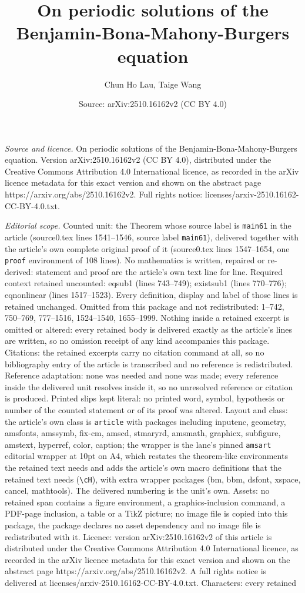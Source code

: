 \documentclass[10pt,a4paper]{amsart}
\title[On periodic solutions of the Benjamin-Bona-Mahony-Burgers eq]{On periodic solutions of the Benjamin-Bona-Mahony-Burgers equation}
\author{Chun Ho Lau, Taige Wang}
\date{Source: arXiv:2510.16162v2 (CC BY 4.0)}
\begin{document}
\maketitle

\noindent\emph{Source and licence.} On periodic solutions of the Benjamin-Bona-Mahony-Burgers equation. Version arXiv:2510.16162v2 (CC BY 4.0), distributed under the Creative Commons Attribution 4.0 International licence, as recorded in the arXiv licence metadata for this exact version and shown on the abstract page https://arxiv.org/abs/2510.16162v2. Full rights notice: licenses/arxiv-2510.16162-CC-BY-4.0.txt.\par\smallskip

\noindent\textit{Editorial scope.} Counted unit: the Theorem whose source label is \texttt{main61} in the article (source0.tex lines 1541--1546, source label \texttt{main61}), delivered together with the article's own complete original proof of it (source0.tex lines 1547--1654, one \texttt{proof} environment of 108 lines). No mathematics is written, repaired or re-derived: statement and proof are the article's own text line for line. Required context retained uncounted: eqsub1 (lines 743--749); existsub1 (lines 770--776); eqnonlinear (lines 1517--1523). Every definition, display and label of those lines is retained unchanged. Omitted from this package and not redistributed: 1--742, 750--769, 777--1516, 1524--1540, 1655--1999. Nothing inside a retained excerpt is omitted or altered: every retained body is delivered exactly as the article's lines are written, so no omission receipt of any kind accompanies this package. Citations: the retained excerpts carry no citation command at all, so no bibliography entry of the article is transcribed and no reference is redistributed. Reference adaptation: none was needed and none was made; every reference inside the delivered unit resolves inside it, so no unresolved reference or citation is produced. Printed slips kept literal: no printed word, symbol, hypothesis or number of the counted statement or of its proof was altered. Layout and class: the article's own class is \texttt{article} with packages including inputenc, geometry, amsfonts, amssymb, fix-cm, amscd, stmaryrd, amsmath, graphicx, subfigure, amstext, hyperref, color, caption; the wrapper is the lane's pinned \texttt{amsart} editorial wrapper at 10pt on A4, which restates the theorem-like environments the retained text needs and adds the article's own macro definitions that the retained text needs (\texttt{\textbackslash cH}), with extra wrapper packages (bm, bbm, dsfont, xspace, cancel, mathtools). The delivered numbering is the unit's own. Assets: no retained span contains a figure environment, a graphics-inclusion command, a PDF-page inclusion, a table or a TikZ picture; no image file is copied into this package, the package declares no asset dependency and no image file is redistributed with it. Licence: version arXiv:2510.16162v2 of this article is distributed under the Creative Commons Attribution 4.0 International licence, as recorded in the arXiv licence metadata for this exact version and shown on the abstract page https://arxiv.org/abs/2510.16162v2. A full rights notice is delivered at licenses/arxiv-2510.16162-CC-BY-4.0.txt. Characters: every retained 
\end{document}
